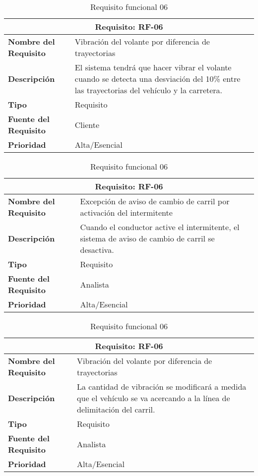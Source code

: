 \documentclass[10pt,a4paper,oldfontcommands]{dpds}
\begin{document}
\begin{table}[H]
\begin{center}
\begin{tabular}{p{} p{7cm}}
\multicolumn{2}{c}{\textbf{Requisito: RF-06} } \\
\hline \hline
\textbf{Nombre del Requisito} &  Vibración del volante por diferencia de trayectorias\\
\textbf{Descripción} & El sistema tendrá que hacer vibrar el volante cuando se detecta una desviación del 10\% entre las trayectorias del vehículo y la carretera. \\
\textbf{Tipo} & Requisito  \\
\textbf{Fuente del Requisito} & Cliente  \\
\textbf{Prioridad} & Alta/Esencial  \\ \hline
\end{tabular}
\caption{Requisito funcional 06}
\label{tab:RF-06}
\end{center}
\end{table}

\begin{table}[H]
\begin{center}
\begin{tabular}{p{} p{7cm}}
\multicolumn{2}{c}{\textbf{Requisito: RF-06} } \\
\hline \hline
\textbf{Nombre del Requisito} &  Excepción de aviso de cambio de carril por activación del intermitente\\
\textbf{Descripción} & Cuando el conductor active el intermitente, el sistema de aviso de cambio de carril se desactiva. \\
\textbf{Tipo} & Requisito  \\
\textbf{Fuente del Requisito} & Analista  \\
\textbf{Prioridad} & Alta/Esencial  \\ \hline
\end{tabular}
\caption{Requisito funcional 06}
\label{tab:RF-06}
\end{center}
\end{table}

\begin{table}[H]
\begin{center}
\begin{tabular}{p{} p{7cm}}
\multicolumn{2}{c}{\textbf{Requisito: RF-06} } \\
\hline \hline
\textbf{Nombre del Requisito} &  Vibración del volante por diferencia de trayectorias\\
\textbf{Descripción} & La cantidad de vibración se modificará a medida que el vehículo se va acercando a la línea de delimitación del carril. \\
\textbf{Tipo} & Requisito  \\
\textbf{Fuente del Requisito} & Analista  \\
\textbf{Prioridad} & Alta/Esencial  \\ \hline
\end{tabular}
\caption{Requisito funcional 06}
\label{tab:RF-06}
\end{center}
\end{table}
\end{document}
